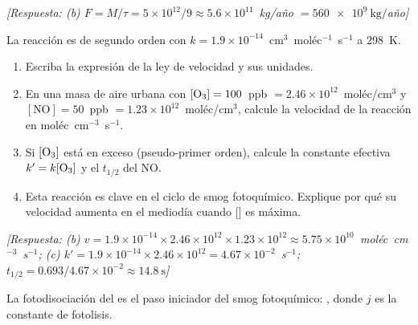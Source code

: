 \begin{bloque_ejercicios}
\begin{ejercicios}
\textit{[Respuesta:
(b) $F = M/\tau = 5\times10^{12}/9
    \approx 5.6\times10^{11}$~kg/a\~no
    $= \SI{560e9}{\kilo\gram}/$a\~no]}

\item La reacci\'on  es de segundo orden con
$k = 1.9\times10^{-14}$~cm$^3$~mol\'ec$^{-1}$~s$^{-1}$ a
\SI{298}{\kelvin}.

\begin{enumerate}[label=\alph*)]
    \item Escriba la expresi\'on de la ley de velocidad y sus unidades.
    \item En una masa de aire urbana con
          $[\ce{O3}] = 100$~ppb $= 2.46\times10^{12}$~mol\'ec/cm$^3$
          y $[\text{NO}] = 50$~ppb $= 1.23\times10^{12}$~mol\'ec/cm$^3$,
          calcule la velocidad de la reacci\'on en
          mol\'ec~cm$^{-3}$~s$^{-1}$.
    \item Si $[\ce{O3}]$ est\'a en exceso (pseudo-primer orden),
          calcule la constante efectiva $k' = k[\ce{O3}]$ y el
          $t_{1/2}$ del NO.
    \item Esta reacci\'on es clave en el ciclo de smog fotoqu\'imico.
          Explique por qu\'e su velocidad aumenta en el mediod\'ia
          cuando [] es m\'axima.
\end{enumerate}

\textit{[Respuesta:
(b) $v = 1.9\times10^{-14}
    \times 2.46\times10^{12}\times1.23\times10^{12}
    \approx 5.75\times10^{10}$~mol\'ec~cm$^{-3}$~s$^{-1}$;
(c) $k' = 1.9\times10^{-14}\times2.46\times10^{12}
    = 4.67\times10^{-2}$~s$^{-1}$;
    $t_{1/2} = 0.693/4.67\times10^{-2}
    \approx \SI{14.8}{\second}$]}

\item La fotodisociaci\'on del  es el paso iniciador del
smog fotoqu\'imico: , donde
$j$ es la constante de fotolisis.


\end{ejercicios}
\end{bloque_ejercicios}
